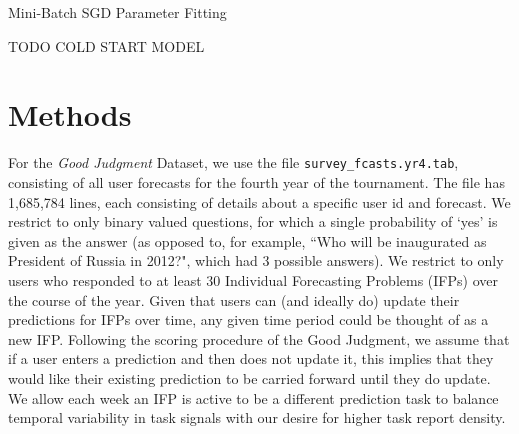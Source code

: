 \documentclass{article}
\begin{document}
\begin{algorithm}
  \begin{algorithmic}
    \ENDFOR
    \ENDFOR
  \end{algorithmic}
  \caption{Mini-Batch SGD Parameter Fitting}
\end{algorithm}

TODO COLD START MODEL


\section{Methods}





For the \emph{Good Judgment} Dataset, we use the file \texttt{survey\_fcasts.yr4.tab}, consisting of all user forecasts for the fourth year of the tournament. The file has 1,685,784 lines, each consisting of details about a specific user id and forecast. We restrict to only binary valued questions, for which a single probability of `yes' is given as the answer (as opposed to, for example, ``Who will be inaugurated as President of Russia in 2012?", which had 3 possible answers). We restrict to only users who responded to at least 30 Individual Forecasting Problems (IFPs) over the course of the year. Given that users can (and ideally do) update their predictions for IFPs over time, any given time period could be thought of as a new IFP. Following the scoring procedure of the Good Judgment, we assume that if a user enters a prediction and then does not update it, this implies that they would like their existing prediction to be carried forward until they do update. We allow each week an IFP is active to be a different prediction task to balance temporal variability in task signals with our desire for higher task report density.
\end{document}

